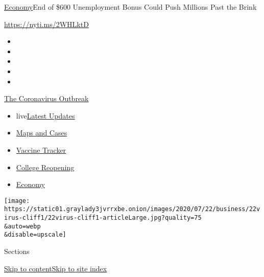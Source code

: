 \href{/section/business/economy}{Economy}\textbar{}End of \$600
Unemployment Bonus Could Push Millions Past the Brink

\href{https://nyti.ms/2WHLktD}{https://nyti.ms/2WHLktD}

\begin{itemize}
\item
\item
\item
\item
\item
\end{itemize}

\href{https://www.nytimes3xbfgragh.onion/news-event/coronavirus?action=click\&pgtype=Article\&state=default\&region=TOP_BANNER\&context=storylines_menu}{The
Coronavirus Outbreak}

\begin{itemize}
\tightlist
\item
  live\href{https://www.nytimes3xbfgragh.onion/2020/08/04/world/coronavirus-cases.html?action=click\&pgtype=Article\&state=default\&region=TOP_BANNER\&context=storylines_menu}{Latest
  Updates}
\item
  \href{https://www.nytimes3xbfgragh.onion/interactive/2020/us/coronavirus-us-cases.html?action=click\&pgtype=Article\&state=default\&region=TOP_BANNER\&context=storylines_menu}{Maps
  and Cases}
\item
  \href{https://www.nytimes3xbfgragh.onion/interactive/2020/science/coronavirus-vaccine-tracker.html?action=click\&pgtype=Article\&state=default\&region=TOP_BANNER\&context=storylines_menu}{Vaccine
  Tracker}
\item
  \href{https://www.nytimes3xbfgragh.onion/2020/08/02/us/covid-college-reopening.html?action=click\&pgtype=Article\&state=default\&region=TOP_BANNER\&context=storylines_menu}{College
  Reopening}
\item
  \href{https://www.nytimes3xbfgragh.onion/live/2020/08/04/business/stock-market-today-coronavirus?action=click\&pgtype=Article\&state=default\&region=TOP_BANNER\&context=storylines_menu}{Economy}
\end{itemize}

\texttt{[image: https://static01.graylady3jvrrxbe.onion/images/2020/07/22/business/22virus-cliff1/22virus-cliff1-articleLarge.jpg?quality=75\\\&auto=webp\\\&disable=upscale]}

Sections

\protect\hyperlink{site-content}{Skip to
content}\protect\hyperlink{site-index}{Skip to site index}


